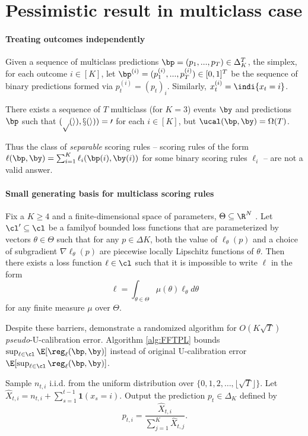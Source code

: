 
\section{Pessimistic result in multiclass case}
\paragraph{Treating outcomes independently}
Given a sequence of multiclass predictions $\bp = (p_1,...,p_T ) \in \Delta_K^T$, the simplex, for each outcome $i \in [K]$, let $\bp^{(i)} =(p_1^{(i)},...,p_T^{(i)}) \in [0, 1]^T$ be the sequence of binary predictions formed via $p_t^{(i)} = (p_t)_i$. Similarly, $x_t^{(i)} = \indi{x_t = i}$.
\begin{theorem}
    There exists a sequence of $T$ multiclass (for $K = 3$) events $\by$ and predictions $\bp$ such that $\cal(p(i), x(i)) = 0$ for each $i\in [K]$, but $\ucal(\bp, \by) = \Omega(T)$.
\end{theorem}
Thus the class of \textit{separable} scoring rules – scoring rules of the form $\ell(\bp, \by) = \sum_{i=1}^K \ell_i(\bp(i), \by(i))$ for some binary scoring rules $\ell_i$ – are not a valid answer.

\paragraph{Small generating basis for multiclass scoring rules}
\begin{theorem}
Fix a $K \geq 4$ and a finite-dimensional space of parameters, $\Theta \subseteq \R^N$ . Let $\cl' \subseteq \cl$ be a familyof bounded loss functions that are parameterized by vectors $\theta \in \Theta$ such that for any $p \in \Delta K$, both the value of $\ell_\theta(p)$ and a choice of subgradient $\nabla\ell_\theta(p)$ are piecewise locally Lipschitz functions of $\theta$. Then there exists a loss function $\ell \in \cl$ such that it is impossible to write $\ell$ in the form 
\[
\ell = \int_{\theta \in \Theta} \mu(\theta)\ell_\theta d\theta
\]
for any finite measure $\mu$ over $\Theta$.
\end{theorem}

Despite these barriers, \cite{kleinberg2023ucal} demonstrate a randomized algorithm for $O(K\sqrt{T})$ \textit{pseudo}-U-calibration error. Algorithm \ref{alg:FFTPL} bounds $\sup_{\ell\in\cl} \E[\reg_\ell(\bp,\by)]$ instead of original U-calibration error $\E[\sup_{\ell\in\cl}\reg_\ell(\bp,\by)]$.

\begin{algorithm}
\caption{\textsc{ForecastFTPL}}\label{alg:FFTPL}
\begin{algorithmic}[1]
        \State Sample $n_{t,i}$ i.i.d. from the uniform distribution over $\{0, 1, 2, \ldots, \lfloor \sqrt{T} \rfloor\}$.
    \EndFor
        \State Let $\hat{X}_{t,i} = n_{t,i} + \sum_{s=1}^{t-1} \mathbf{1}(x_s = i)$.
    \EndFor
    \State Output the prediction $p_t \in \Delta_K$ defined by
    \[
        p_{t,i} = \frac{\hat{X}_{t,i}}{\sum_{j=1}^{K} \hat{X}_{t,j}}.
    \]
\EndFor
\end{algorithmic}
\end{algorithm}
